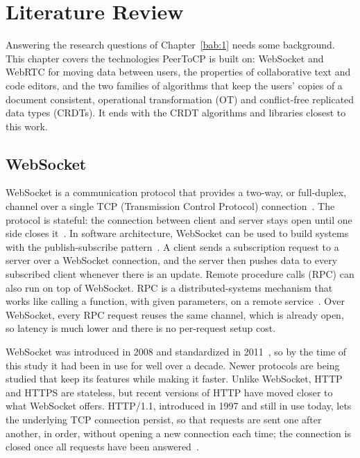 \chapter{Literature Review}
\label{bab:2}

Answering the research questions of Chapter~\ref{bab:1} needs some background. This chapter covers the technologies PeerToCP is built on: WebSocket and WebRTC for moving data between users, the properties of collaborative text and code editors, and the two families of algorithms that keep the users' copies of a document consistent, operational transformation (OT) and conflict-free replicated data types (CRDTs). It ends with the CRDT algorithms and libraries closest to this work.

\section{WebSocket}

WebSocket is a communication protocol that provides a two-way, or full-duplex, channel over a single TCP (Transmission Control Protocol) connection~\citep{fette2011websocket}. The protocol is stateful: the connection between client and server stays open until one side closes it~\citep{pimentel2012communicating}. In software architecture, WebSocket can be used to build systems with the publish-subscribe pattern~\citep{ganaputra2015asynchronous}. A client sends a subscription request to a server over a WebSocket connection, and the server then pushes data to every subscribed client whenever there is an update. Remote procedure calls (RPC) can also run on top of WebSocket. RPC is a distributed-systems mechanism that works like calling a function, with given parameters, on a remote service~\citep{srinivasan1995rpc}. Over WebSocket, every RPC request reuses the same channel, which is already open, so latency is much lower and there is no per-request setup cost.

WebSocket was introduced in 2008 and standardized in 2011~\citep{fette2011websocket}, so by the time of this study it had been in use for well over a decade. Newer protocols are being studied that keep its features while making it faster. Unlike WebSocket, HTTP and HTTPS are stateless, but recent versions of HTTP have moved closer to what WebSocket offers. HTTP/1.1, introduced in 1997 and still in use today, lets the underlying TCP connection persist, so that requests are sent one after another, in order, without opening a new connection each time; the connection is closed once all requests have been answered~\citep{krishnamurthy1999key, fielding2015hypertext}.

